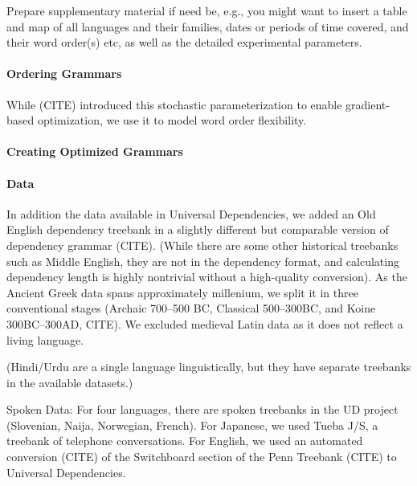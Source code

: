 \documentclass[11pt,a4paper]{article}
\begin{document}
{\color{blue}Prepare supplementary material if need be, e.g., you might want to insert a table and map of all languages and their families, dates or periods of time covered, and their word order(s) etc, as well as the detailed experimental parameters.}



\paragraph{Ordering Grammars}





While (CITE) introduced this stochastic parameterization to enable gradient-based optimization, we use it to model word order flexibility.

\paragraph{Creating Optimized Grammars}


\paragraph{Data}


In addition the data available in Universal Dependencies, we added an Old English dependency treebank in a slightly different but comparable version of dependency grammar (CITE). (While there are some other historical treebanks such as Middle English, they are not in the dependency format, and calculating dependency length is highly nontrivial without a high-quality conversion).
As the Ancient Greek data spans approximately millenium, we split it in three conventional stages (Archaic 700--500 BC, Classical 500--300BC, and Koine 300BC--300AD, CITE). \citep{taylor1994change}
We excluded medieval Latin data as it does not reflect a living language.




(Hindi/Urdu are a single language linguistically, but they have separate treebanks in the available datasets.)

Spoken Data:
For four languages, there are spoken treebanks in the UD project (Slovenian, Naija, Norwegian, French).
For Japanese, we used Tueba J/S, a treebank of telephone conversations.
For English, we used an automated conversion (CITE) of the Switchboard section of the Penn Treebank (CITE) to Universal Dependencies.
\end{document}
